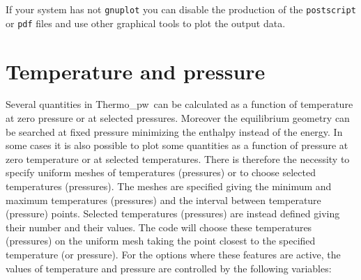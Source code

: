 \documentclass[12pt,a4paper,twoside]{report}
\def\thermo{{\sc Thermo}\_{\sc pw}}
\begin{document}
If your system has not \texttt{gnuplot}
you can disable the production of the \texttt{postscript} or 
\texttt{pdf} files and use other
graphical tools to plot the output data. 

\newpage
{\color{coral}\section{Temperature and pressure}}
\color{black}
Several quantities in \thermo\ can be calculated as a function of temperature
at zero pressure or at selected pressures.
Moreover the equilibrium geometry can be searched at fixed pressure 
minimizing the enthalpy instead of the energy.
In some cases it is also possible to plot some quantities as a function 
of pressure at zero temperature or at selected temperatures.
There is therefore the necessity to specify uniform meshes of temperatures
(pressures) or to choose selected temperatures (pressures). 
The meshes are specified giving the minimum and maximum temperatures 
(pressures) and the interval between temperature (pressure) points.
Selected temperatures (pressures) are instead defined giving their number 
and their values. The code will choose these temperatures (pressures) on 
the uniform mesh taking the point closest to the specified temperature 
(or pressure).
For the options where these features are active, the values of temperature
and pressure are controlled by the following variables:
\end{document}
